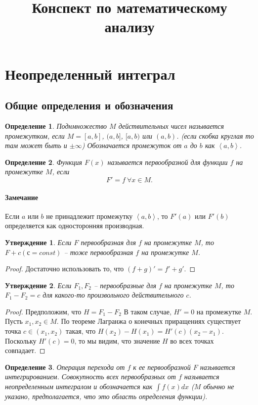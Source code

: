 \documentclass{article}
\theoremstyle{plain}
\newtheorem{claim}{Утверждение}
\newtheorem{definition}{Определение}
\theoremstyle{definition}
\theoremstyle{remark}
\begin{document}
\title{Конспект по математическому анализу}
\date{}
\maketitle

\tableofcontents

\newpage
\section{Неопределенный интеграл}
\subsection{Общие определения и обозначения}
\begin{definition} Поднмножество $M$ действительных чисел называется промежутком, если $M = [a, b]$, $(a, b]$, $[a, b)$ или $(a, b)$. (если скобка круглая то там может быть и $\pm\infty$) Обозначается промежуток от $a$ до $b$ как $\left<a, b\right>$. 
\end{definition}
\begin{definition} Функция $F(x)$ называется первообразной для функции $f$ на промежутке $M$, если \[F'= f ~ \forall x \in M.\]
\end{definition}
\paragraph{Замечание} Если $a$ или $b$ не принадлежит промежутку $\left<a, b\right>$, то $F'(a)$ или $F'(b)$ определяется как односторонняя производная.

\begin{claim} Если $F$ первообразная для $f$ на промежутке $M$, то $F + c (с = const)$ -- тоже первообразная $f$ на промежутке $M$. 
\end{claim}
\begin{proof} Достаточно использовать то, что $(f+g)' = f' + g'.$ 
\end{proof}
\begin{claim}
Если $F_1, F_2$ -- первообразные для $f$ на промежутке $M$, то $F_1 - F_2 = c$ для какого-то произвольного действительного $c$. 
\end{claim}
\begin{proof} Предположим, что $H = F_1 - F_2$ В таком случае, $H' = 0$ на промежутке $M$. Пусть $x_1, x_2 \in M.$ По теореме Лагранжа о конечных приращениях существует точка $c \in (x_1, x_2)$ такая, что $H(x_2) - H(x_1) = H'(c)(x_2 - x_1).$ Поскольку $H'(c) = 0$, то мы видим, что значение $H$ во всех точках совпадает.
\end{proof}
\begin{definition} Операция перехода от $f$ к ее первообразной $F$ называется интегрированием. Совокупность всех первообразных от $f$ называется неопределенным интегралом и обозначается как $\int f(x)dx$ ($M$ обычно не указано, предполагается, что это область определения функции).
\end{definition}
\end{document}
